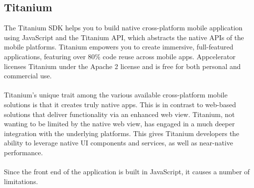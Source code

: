 \subsection{Titanium}

The Titanium SDK helps you to build native cross-platform mobile application using JavaScript and the Titanium API,
which abstracts the native APIs of the mobile platforms.  Titanium empowers you to create immersive, full-featured applications, featuring over 80\% code reuse across mobile apps.
Appcelerator licenses Titanium under the Apache 2 license and is free for both personal and commercial use.

\paragraph{}
Titanium's unique trait among the various available cross-platform mobile solutions is that it creates truly native apps.
This is in contrast to web-based solutions that deliver functionality via an enhanced web view.
Titanium, not wanting to be limited by the native web view, has engaged in a much deeper integration with the underlying platforms.
This gives Titanium developers the ability to leverage native UI components and  services, as well as near-native performance.

\paragraph{}
Since the front end of the application is built in JavaScript, it causes a number of limitations.


